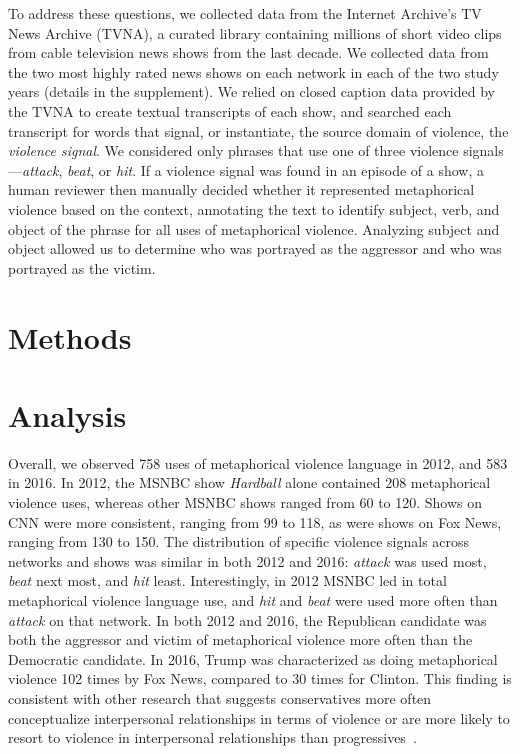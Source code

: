To address these questions, we collected data
from the Internet Archive's TV News Archive (TVNA), a curated
library containing millions of short video clips from cable television news
shows from the last decade. We collected data from the two most highly rated
news shows on each network in each of the two study years (details in
the supplement). We relied on closed caption data provided by the TVNA
to create textual transcripts of each show, and searched each transcript for
words that signal, or instantiate, the source domain of violence, the
\emph{violence signal}. We considered only phrases that use one of three
violence signals---\emph{attack}, \emph{beat}, or \emph{hit}. If a violence
signal was found in an episode of a show, a human reviewer then manually decided
whether it represented metaphorical violence based on the context, annotating
the text to identify subject, verb, and object of the phrase for all uses of
metaphorical violence.  Analyzing subject and object allowed us to determine who
was portrayed as the aggressor and who was portrayed as the victim.

\section{Methods}


\section{Analysis}

Overall, we observed 758 uses of metaphorical violence language in 2012, and 583
in 2016. In 2012, the MSNBC show \emph{Hardball} alone contained 208
metaphorical violence uses, whereas other MSNBC shows ranged from 60 to 120.
Shows on CNN were more consistent, ranging from 99 to 118, as were shows on Fox
News, ranging from 130 to 150. The distribution of specific violence signals
across networks and shows was similar in both 2012 and 2016: \emph{attack} was
used most, \emph{beat} next most, and \emph{hit} least. Interestingly, in 2012
MSNBC led in total metaphorical violence language use, and \emph{hit} and
\emph{beat} were used more often than \emph{attack} on that network.
In both 2012 and 2016, the
Republican candidate was both the aggressor and victim of metaphorical violence
more often than the Democratic candidate. In 2016, Trump was characterized as
doing metaphorical violence 102 times by Fox News, compared to 30 times for
Clinton. This finding is consistent with other research that suggests
conservatives more often conceptualize interpersonal relationships in terms of
violence or are more likely to resort to violence in interpersonal relationships
than progressives~\cite{Lakoff1996, Cohen1996}. 

